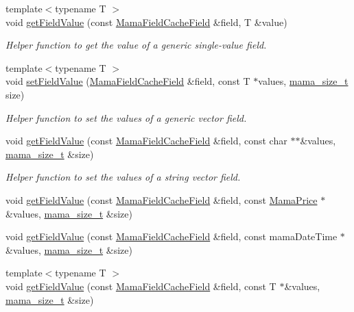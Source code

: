 \begin{DoxyCompactItemize}
{\footnotesize template$<$typename T $>$ }\\void \hyperlink{namespaceWombat_aa23574320542aaec877c264f403fde3a}{getFieldValue} (const \hyperlink{classWombat_1_1MamaFieldCacheField}{MamaFieldCacheField} \&field, T \&value)
\begin{DoxyCompactList}\small\item\em Helper function to get the value of a generic single-\/value field. \item\end{DoxyCompactList}\item 
{\footnotesize template$<$typename T $>$ }\\void \hyperlink{namespaceWombat_a959adfb20a05c253efbc74279136ba94}{setFieldValue} (\hyperlink{classWombat_1_1MamaFieldCacheField}{MamaFieldCacheField} \&field, const T $\ast$values, \hyperlink{classmama__size__t}{mama\_\-size\_\-t} size)
\begin{DoxyCompactList}\small\item\em Helper function to set the values of a generic vector field. \item\end{DoxyCompactList}\item 
void \hyperlink{namespaceWombat_a07930ae65ae71490a8f74ea0ae7ab013}{getFieldValue} (const \hyperlink{classWombat_1_1MamaFieldCacheField}{MamaFieldCacheField} \&field, const char $\ast$$\ast$\&values, \hyperlink{classmama__size__t}{mama\_\-size\_\-t} \&size)
\begin{DoxyCompactList}\small\item\em Helper function to set the values of a string vector field. \item\end{DoxyCompactList}\item 
void \hyperlink{namespaceWombat_a620d57026928c4adef3dd157050a4116}{getFieldValue} (const \hyperlink{classWombat_1_1MamaFieldCacheField}{MamaFieldCacheField} \&field, const \hyperlink{classWombat_1_1MamaPrice}{MamaPrice} $\ast$\&values, \hyperlink{classmama__size__t}{mama\_\-size\_\-t} \&size)
\item 
void \hyperlink{namespaceWombat_af33eaf1993e8aebd08598298b4139f56}{getFieldValue} (const \hyperlink{classWombat_1_1MamaFieldCacheField}{MamaFieldCacheField} \&field, const mamaDateTime $\ast$\&values, \hyperlink{classmama__size__t}{mama\_\-size\_\-t} \&size)
\item 
{\footnotesize template$<$typename T $>$ }\\void \hyperlink{namespaceWombat_af39725b3f2d193e7b4fb37dc9e00ab00}{getFieldValue} (const \hyperlink{classWombat_1_1MamaFieldCacheField}{MamaFieldCacheField} \&field, const T $\ast$\&values, \hyperlink{classmama__size__t}{mama\_\-size\_\-t} \&size)
$$
\end{DoxyCompactItemize}
